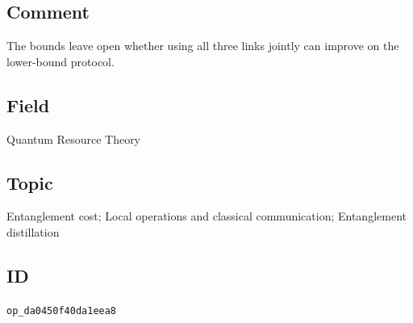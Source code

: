 \subsection*{Comment}

The bounds leave open whether using all three links jointly can improve on the lower-bound protocol.

\subsection*{Field}

Quantum Resource Theory

\subsection*{Topic}

Entanglement cost; Local operations and classical communication; Entanglement distillation

\subsection*{ID}

\texttt{op\_da0450f40da1eea8}
